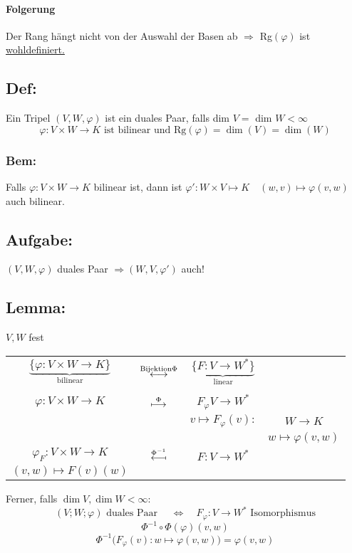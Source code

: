\documentclass[titlepage,12pt,a4paper,ngerman]{report}
\newcommand{\tx}[1]{\textrm{#1}}
\newcommand{\ub}[1]{\underbrace{#1}}
\begin{document}
\paragraph{Folgerung}
Der Rang hängt nicht von der Auswahl der Basen ab $\Rightarrow$ Rg$(\varphi)$ ist \underline{wohldefiniert.}

\subsection{Def:}
Ein Tripel $(V,W,\varphi)$ ist ein duales Paar, falls dim $V =$ dim $W < \infty $
$$\varphi: V \times W \to K \tx{ ist bilinear und Rg}(\varphi) = \dim (V) = \dim (W)$$


\subsubsection*{Bem:} Falls $ \varphi: V \times W \to K $ bilinear ist, dann ist $ \varphi': W \times V \mapsto K \quad (w,v) \mapsto \varphi(v,w)$ auch bilinear.
\subsection*{Aufgabe:}
$ (V,W,\varphi) $ duales Paar $ \Rightarrow (W,V,\varphi') $ auch!
\subsection{Lemma:} $ V,W $ fest
\begin{center}
	\begin{tabular}{cccc}
		$ \ub{\{\varphi: V\times W \to K \}}_{\tx{bilinear}} $ & $ \buildrel \tx{Bijektion} \Phi \over \longleftrightarrow$ & $ \ub{\{F: V \to W^*\}}_{\tx{linear}} $ & $  $\\
		\\
		$ \varphi: V \times W \to K $ & $ \buildrel \Phi \over \longmapsto $ & $ F_\varphi V \to W^* $ & $  $\\
		$  $ & $  $ & $ v \mapsto F_\varphi (v) : $ & $ W \to K $\\
		$  $ & $  $ & $  $ & $ w \mapsto \varphi(v,w) $\\
		$ \varphi_F : V \times W \to K $ & $ \buildrel \Phi ^{-1} \over{\reflectbox{$\longmapsto$}}$ & $ F: V \to W^* $ & $  $\\
		$ (v,w) \mapsto F(v)(w) $ & $  $ & $  $ & $  $\\
	\end{tabular}
\end{center}
Ferner, falls $ \dim V, \dim W < \infty $:\\
$$ (V;W;\varphi) \tx{ duales Paar } \quad \Leftrightarrow \quad F_\varphi : V \to W^* \tx{ Isomorphismus}$$
$$\Phi^{-1} \circ \Phi (\varphi)(v,w)$$
$$\Phi^{-1}\bigg(F_\varphi(v):w\mapsto\varphi(v,w)\bigg) = \varphi(v,w)$$   
\end{document}
